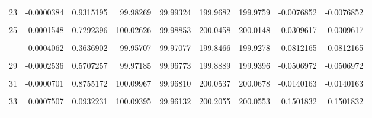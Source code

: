 \documentclass[a4paper]{tufte-handout}
\begin{document}
\begin{table}
{\begin{tabular}[t]{rrrrrrrrr}
23 & -0.0000384 & 0.9315195 & 99.98269 & 99.99324 & 199.9682 & 199.9759 & -0.0076852 & -0.0076852\\
\cellcolor{gray!6}{24} & \cellcolor{gray!6}{0.0000409} & \cellcolor{gray!6}{0.9270843} & \cellcolor{gray!6}{100.09771} & \cellcolor{gray!6}{100.04714} & \cellcolor{gray!6}{200.1530} & \cellcolor{gray!6}{200.1448} & \cellcolor{gray!6}{0.0081912} & \cellcolor{gray!6}{0.0081912}\\
25 & 0.0001548 & 0.7292396 & 100.02626 & 99.98853 & 200.0458 & 200.0148 & 0.0309617 & 0.0309617\\
\cellcolor{gray!6}{26} & \cellcolor{gray!6}{0.0000006} & \cellcolor{gray!6}{0.9989683} & \cellcolor{gray!6}{99.91310} & \cellcolor{gray!6}{99.97783} & \cellcolor{gray!6}{199.8911} & \cellcolor{gray!6}{199.8909} & \cellcolor{gray!6}{0.0001156} & \cellcolor{gray!6}{0.0001156}\\
\addlinespace
27 & -0.0004062 & 0.3636902 & 99.95707 & 99.97077 & 199.8466 & 199.9278 & -0.0812165 & -0.0812165\\
\cellcolor{gray!6}{28} & \cellcolor{gray!6}{0.0004554} & \cellcolor{gray!6}{0.3085175} & \cellcolor{gray!6}{99.97648} & \cellcolor{gray!6}{100.03075} & \cellcolor{gray!6}{200.0983} & \cellcolor{gray!6}{200.0072} & \cellcolor{gray!6}{0.0910862} & \cellcolor{gray!6}{0.0910862}\\
29 & -0.0002536 & 0.5707257 & 99.97185 & 99.96773 & 199.8889 & 199.9396 & -0.0506972 & -0.0506972\\
\cellcolor{gray!6}{30} & \cellcolor{gray!6}{0.0005116} & \cellcolor{gray!6}{0.2525925} & \cellcolor{gray!6}{100.07632} & \cellcolor{gray!6}{100.03861} & \cellcolor{gray!6}{200.2173} & \cellcolor{gray!6}{200.1149} & \cellcolor{gray!6}{0.1023880} & \cellcolor{gray!6}{0.1023880}\\
31 & -0.0000701 & 0.8755172 & 100.09967 & 99.96810 & 200.0537 & 200.0678 & -0.0140163 & -0.0140163\\
\addlinespace
\cellcolor{gray!6}{32} & \cellcolor{gray!6}{0.0002323} & \cellcolor{gray!6}{0.6033995} & \cellcolor{gray!6}{99.82793} & \cellcolor{gray!6}{100.03516} & \cellcolor{gray!6}{199.9095} & \cellcolor{gray!6}{199.8631} & \cellcolor{gray!6}{0.0464353} & \cellcolor{gray!6}{0.0464353}\\
33 & 0.0007507 & 0.0932231 & 100.09395 & 99.96132 & 200.2055 & 200.0553 & 0.1501832 & 0.1501832\\
\cellcolor{gray!6}{34} & \cellcolor{gray!6}{-0.0002231} & \cellcolor{gray!6}{0.6178539} & \cellcolor{gray!6}{99.77223} & \cellcolor{gray!6}{100.08013} & \cellcolor{gray!6}{199.8078} & \cellcolor{gray!6}{199.8524} & \cellcolor{gray!6}{-0.0445895} & \cellcolor{gray!6}{-0.0445895}\\

\end{tabular}}
\end{table}
\end{document}
